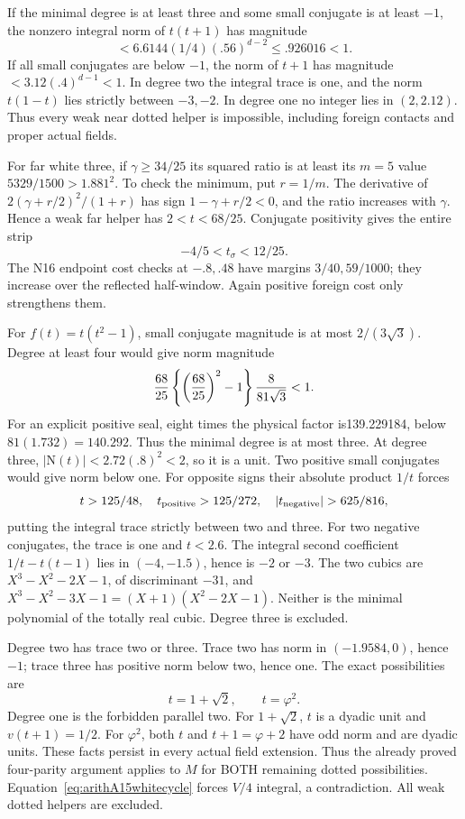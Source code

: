 If the minimal degree is at least three and some small conjugate
is at least \(-1\), the nonzero integral norm of \(t(t+1)\)
has magnitude
\[
              <6.6144(1/4)(.56)^{d-2}\le.926016<1 .
\]
If all small conjugates are below \(-1\), the norm of \(t+1\)
has magnitude \(<3.12(.4)^{d-1}<1\).
In degree two the integral trace is one, and the norm
\(t(1-t)\) lies strictly between \(-3,-2\).
In degree one no integer lies in \((2,2.12)\).
Thus every weak near dotted helper is impossible, including
foreign contacts and proper actual fields.

For far white three, if \(\gamma\ge34/25\) its squared ratio
is at least its \(m=5\) value \(5329/1500>1.881^2\).
To check the minimum, put \(r=1/m\).
The derivative of \(2(\gamma+r/2)^2/(1+r)\) has sign
\(1-\gamma+r/2<0\), and the ratio increases with \(\gamma\).
Hence a weak far helper has \(2<t<68/25\).
Conjugate positivity gives the entire strip
\[
                            -4/5<t_\sigma<12/25 .
\]
The N16 endpoint cost checks at \(-.8,.48\) have margins
\(3/40,59/1000\); they increase over the reflected half-window.
Again positive foreign cost only strengthens them.

For \(f(t)=t(t^2-1)\), small conjugate magnitude is at most
\(2/(3\sqrt3)\).
Degree at least four would give norm magnitude
\[
 {68\over25}\left\{\left({68\over25}\right)^2-1\right\}
                         {8\over81\sqrt3}<1 .
\]
For an explicit positive seal, eight times the physical factor
is139.229184, below \(81(1.732)=140.292\).
Thus the minimal degree is at most three.
At degree three, \(|\mathrm N(t)|<2.72(.8)^2<2\), so it is
a unit.
Two positive small conjugates would give norm below one.
For opposite signs their absolute product \(1/t\) forces
\[
 t>125/48,\quad
 t_{\rm positive}>125/272,\quad
 |t_{\rm negative}|>625/816,
\]
putting the integral trace strictly between two and three.
For two negative conjugates, the trace is one and \(t<2.6\).
The integral second coefficient
\(1/t-t(t-1)\) lies in \((-4,-1.5)\), hence is \(-2\) or \(-3\).
The two cubics are
\(X^3-X^2-2X-1\), of discriminant \(-31\), and
\(X^3-X^2-3X-1=(X+1)(X^2-2X-1)\).
Neither is the minimal polynomial of the totally real cubic.
Degree three is excluded.

Degree two has trace two or three.
Trace two has norm in \((-1.9584,0)\), hence \(-1\);
trace three has positive norm below two, hence one.
The exact possibilities are
\[
                         t=1+\sqrt2,\qquad t=\varphi^2 .
\]
Degree one is the forbidden parallel two.
For \(1+\sqrt2\), \(t\) is a dyadic unit and
\(v(t+1)=1/2\).
For \(\varphi^2\), both \(t\) and \(t+1=\varphi+2\) have
odd norm and are dyadic units.
These facts persist in every actual field extension.
Thus the already proved four-parity argument applies to \(M\)
for BOTH remaining dotted possibilities.
Equation~\eqref{eq:arithA15whitecycle} forces \(V/4\) integral,
a contradiction.
All weak dotted helpers are excluded.

